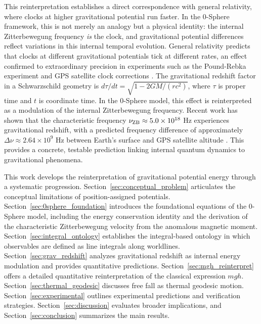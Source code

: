 \documentclass[%
 reprint,
 amsmath,amssymb,
 aps,
 prb,
]{revtex4-2}
\numberwithin{equation}{section}
\begin{document}
This reinterpretation establishes a direct correspondence with general relativity, where clocks at higher gravitational potential run faster. In the 0-Sphere framework, this is not merely an analogy but a physical identity: the internal Zitterbewegung frequency \emph{is} the clock, and gravitational potential differences reflect variations in this internal temporal evolution. General relativity predicts that clocks at different gravitational potentials tick at different rates, an effect confirmed to extraordinary precision in experiments such as the Pound-Rebka experiment \cite{Pound1960} and GPS satellite clock corrections \cite{Ashby2003}. The gravitational redshift factor in a Schwarzschild geometry is $d\tau/dt = \sqrt{1 - 2GM/(rc^2)}$, where $\tau$ is proper time and $t$ is coordinate time. In the 0-Sphere model, this effect is reinterpreted as a modulation of the internal Zitterbewegung frequency. Recent work has shown that the characteristic frequency $\nu_{\rm ZB} \approx 5.0 \times 10^{18}$ Hz experiences gravitational redshift, with a predicted frequency difference of approximately $\Delta \nu \approx 2.64 \times 10^9$ Hz between Earth's surface and GPS satellite altitude \cite{Hanamura2025GravRedshift}. This provides a concrete, testable prediction linking internal quantum dynamics to gravitational phenomena.

This work develops the reinterpretation of gravitational potential energy through a systematic progression. Section~\ref{sec:conceptual_problem} articulates the conceptual limitations of position-assigned potentials. Section~\ref{sec:0sphere_foundation} introduces the foundational equations of the 0-Sphere model, including the energy conservation identity and the derivation of the characteristic Zitterbewegung velocity from the anomalous magnetic moment. Section~\ref{sec:integral_ontology} establishes the integral-based ontology in which observables are defined as line integrals along worldlines. Section~\ref{sec:grav_redshift} analyzes gravitational redshift as internal energy modulation and provides quantitative predictions. Section~\ref{sec:mgh_reinterpret} offers a detailed quantitative reinterpretation of the classical expression $mgh$. Section~\ref{sec:thermal_geodesic} discusses free fall as thermal geodesic motion. Section~\ref{sec:experimental} outlines experimental predictions and verification strategies. Section~\ref{sec:discussion} evaluates broader implications, and Section~\ref{sec:conclusion} summarizes the main results.

\end{document}
